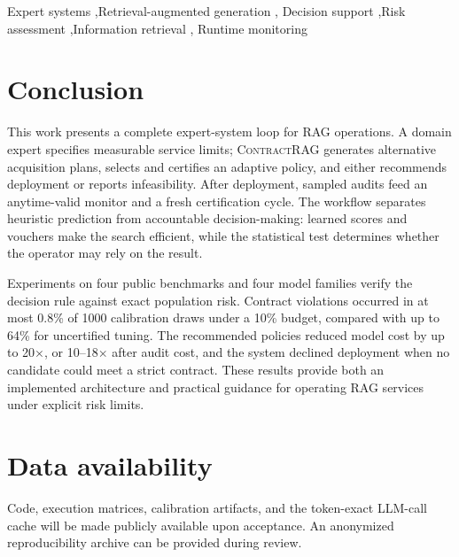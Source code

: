 \documentclass[a4paper,fleqn,doubleblind]{cas-dc}
\newcommand{\system}{\textsc{ContractRAG}\xspace}
\begin{document}
\begin{keywords}
Expert systems \sep Retrieval-augmented generation \sep
Decision support \sep Risk assessment \sep Information retrieval \sep
Runtime monitoring
\end{keywords}

\maketitle









\section{Conclusion}
\label{sec:conclusion}
This work presents a complete expert-system loop for RAG operations.
A domain expert specifies measurable service limits; \system generates
alternative acquisition plans, selects and certifies an adaptive
policy, and either recommends deployment or reports infeasibility.
After deployment, sampled audits feed an anytime-valid monitor and a
fresh certification cycle. The workflow separates heuristic prediction
from accountable decision-making: learned scores and vouchers make the
search efficient, while the statistical test determines whether the
operator may rely on the result.

Experiments on four public benchmarks and four model families verify
the decision rule against exact population risk. Contract
violations occurred in at most 0.8\% of 1000 calibration draws under a
10\% budget, compared with up to 64\% for uncertified tuning. The
recommended policies reduced model cost by up to 20$\times$, or
10--18$\times$ after audit cost, and the system declined deployment
when no candidate could meet a strict contract. These results provide
both an implemented architecture and practical guidance for operating
RAG services under explicit risk limits.

\section*{Data availability}
Code, execution matrices, calibration artifacts, and the token-exact
LLM-call cache will be made publicly available upon acceptance. An
anonymized reproducibility archive can be provided during review.





\clearpage
\addtocounter{page}{-1}
\end{document}
